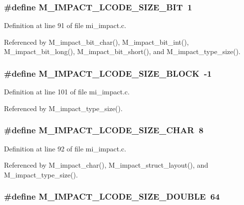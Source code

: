 \subsubsection{\setlength{\rightskip}{0pt plus 5cm}\#define M\_\-IMPACT\_\-LCODE\_\-SIZE\_\-BIT~1}\label{mi__impact_8c_fdae06f1e25c435505683f043067d9ee}




Definition at line 91 of file mi\_\-impact.c.

Referenced by M\_\-impact\_\-bit\_\-char(), M\_\-impact\_\-bit\_\-int(), M\_\-impact\_\-bit\_\-long(), M\_\-impact\_\-bit\_\-short(), and M\_\-impact\_\-type\_\-size().
\subsubsection{\setlength{\rightskip}{0pt plus 5cm}\#define M\_\-IMPACT\_\-LCODE\_\-SIZE\_\-BLOCK~-1}\label{mi__impact_8c_8cec614729ae394245145f7bf8f93d65}




Definition at line 101 of file mi\_\-impact.c.

Referenced by M\_\-impact\_\-type\_\-size().
\subsubsection{\setlength{\rightskip}{0pt plus 5cm}\#define M\_\-IMPACT\_\-LCODE\_\-SIZE\_\-CHAR~8}\label{mi__impact_8c_eda2894167c97cb02e81c484799db725}




Definition at line 92 of file mi\_\-impact.c.

Referenced by M\_\-impact\_\-char(), M\_\-impact\_\-struct\_\-layout(), and M\_\-impact\_\-type\_\-size().
\subsubsection{\setlength{\rightskip}{0pt plus 5cm}\#define M\_\-IMPACT\_\-LCODE\_\-SIZE\_\-DOUBLE~64}\label{mi__impact_8c_a765f5c85d32a0f4a656271eb5d60b7e}




